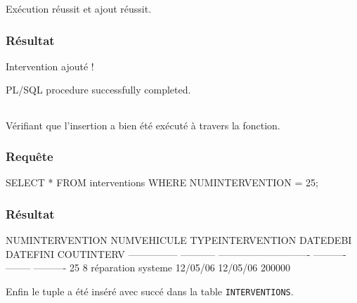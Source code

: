 \documentclass[•]{article}
\begin{document}
Exécution réussit et ajout réussit.

\subsubsection{Résultat}
\begin{sql}
Intervention ajouté !

PL/SQL procedure successfully completed.
\end{sql}

\texttt{ }\\

Vérifiant que l'insertion a bien été exécuté à travers la fonction.
\subsubsection{Requête}
\begin{sql}
SELECT * FROM interventions WHERE NUMINTERVENTION = 25;
\end{sql}

\subsubsection{Résultat}
\begin{sql}
NUMINTERVENTION NUMVEHICULE TYPEINTERVENTION             DATEDEBI	DATEFINI COUTINTERV
--------------- ----------- ---------------------------- ---------- -------- ----------
             25           8 réparation systeme           12/05/06	12/05/06     200000
\end{sql}
 Enfin le tuple a été inséré avec succé dans la table \texttt{INTERVENTIONS}.
\end{document}
